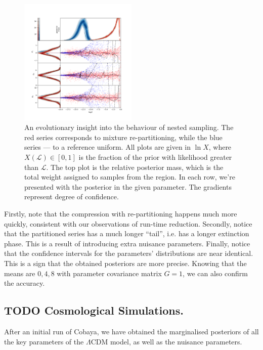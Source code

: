 \documentclass[usenatbib]{mnras}
\begin{document}
\begin{figure}
\includegraphics[width=0.5\textwidth]{./illustrations/higson.png}
\caption{An evolutionary insight into the behaviour of nested sampling. The \color{red} red \color{black} series corresponds to mixture re-partitioning, while the \color{blue} blue \color{black} series --- to a reference uniform. All plots are given in \(\ln X\), where \(X(\mathcal{L}) \in [0,1]\) is the fraction of the prior with likelihood greater than \(\mathcal{L}\). The top plot is the relative posterior mass, which is the total weight assigned to samples from the region. In each row, we're presented with the posterior in the given parameter. The gradients represent degree of confidence. \label{fig:higson}}
\end{figure}

Firstly, note that the compression with re-partitioning happens
much more quickly, consistent with our observations of run-time
reduction. Secondly, notice that the partitioned series has a
much longer ``tail'', i.e. has a longer extinction phase. This is
a result of introducing extra nuisance parameters. Finally, notice
that the confidence intervals for the parameters' distributions
are near identical. This is a sign that the obtained posteriors
are more precise. Knowing that the means are \({0, 4, 8}\) with
parameter covariance matrix \(G = 1\), we can also confirm the
accuracy. 


\subsection{{\bfseries\sffamily TODO} Cosmological Simulations.}
\label{sec:org39ff205}
After an initial run of Cobaya, we have obtained the marginalised
posteriors of all the key parameters of the \(\Lambda\)CDM model,
as well as the nuisance parameters. 
\end{document}
